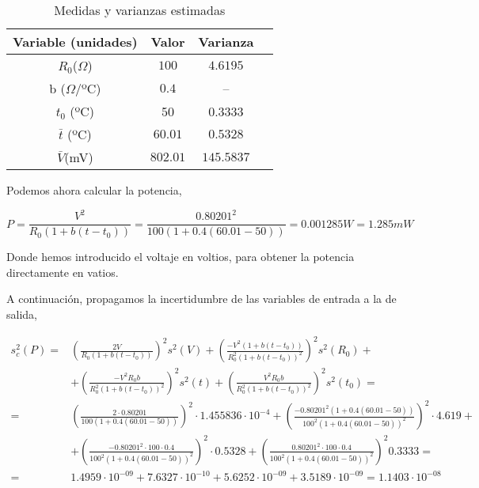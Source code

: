 \begin{table}[h]
\caption{Medidas y varianzas estimadas}
\label{tabdatos}
\centering
\begin{tabular}{cccc}
\hline
Variable (unidades) & Valor & Varianza  \\ 
\hline
\hline
$R_0$($\Omega$)&$100$&$4.6195$\\
\hline
b ($\Omega$/ºC)& $0.4$ &--\\
\hline
$t_0$ (ºC)& 50& 0.3333\\
\hline 
 $\bar{t}$ (ºC)&$60.01$&$0.5328$\\
\hline 
$\bar{V}$(mV)& $802.01$&$145.5837$\\
\hline
\hline
\end{tabular}
\end{table}

Podemos ahora calcular la potencia,

\begin{equation*}
P = \frac{V^2}{R_0\left(1+b(t-t_0)\right)}=\frac{0.80201^2}{100\left(1+0.4(60.01-50)\right)} =  0.001285 W = 1.285 mW
\end{equation*}

Donde hemos introducido el voltaje en voltios, para  obtener la potencia directamente en vatios.

A continuación, propagamos la incertidumbre de las variables de entrada a la de salida,

\begin{align*}
s_c^2(P) =& \left(\frac{2V}{R_0\left(1+b(t-t_0)\right)}\right)^2 s^2(V)+ \left(\frac{-V^2\left(1+b(t-t_0)\right)}{R_0^2\left(1+b(t-t_0)\right)^2}\right)^2 s^2(R_0)+\\
&+ \left(\frac{-V^2R_0b}{R_0^2\left(1+b(t-t_0)\right)^2}\right)^2 s^2(t)+\left(\frac{V^2R_0b}{R_0^2\left(1+b(t-t_0)\right)^2}\right)^2 s^2(t_0)=\\
=& \left(\frac{2 \cdot 0.80201}{100\left(1+0.4(60.01-50)\right)}\right)^2 \cdot 1.455836\cdot10^{-4} + \left(\frac{- 0.80201^2\left(1+0.4(60.01-50)\right)}{100^2\left(1+0.4(60.01-50)\right)^2}\right)^2 \cdot 4.619+\\
&+ \left(\frac{- 0.80201^2\cdot100\cdot0.4}{100^2\left(1+0.4(60.01-50)\right)^2}\right)^2\cdot 0.5328 +\left(\frac{0.80201^2\cdot100\cdot0.4}{100^2\left(1+0.4(60.01-50)\right)^2}\right)^2 0.3333=\\
=&1.4959\cdot10^{-09} + 7.6327\cdot10^{-10} + 5.6252\cdot10^{-09} + 3.5189\cdot10^{-09} =  1.1403\cdot 10^{-08}
\end{align*} 

